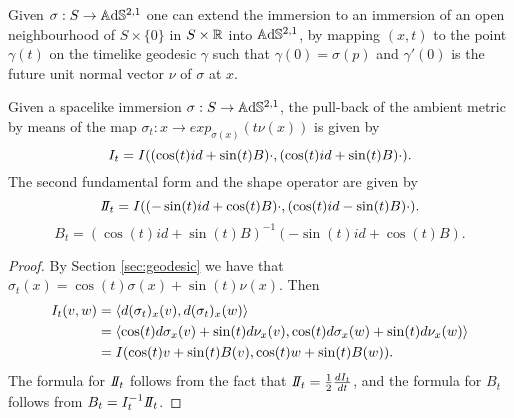 Given $\sigma:S \to \mathbb{A}\mathrm{d}\mathbb{S}^{2,1}$ one can extend the immersion to an immersion of an open neighbourhood of $S \times\{0\}$ in $S\times\mathbb{R}$ into $\mathbb{A}\mathrm{d}\mathbb{S}^{2,1}$, by mapping $(x,t)$ to the point $\gamma(t)$ on the timelike geodesic $\gamma$ such that $\gamma(0)=\sigma(p)$ and $\gamma'(0)$ is the future unit normal vector $\nu$ of $\sigma$ at $x$.

\begin{lemma}\label{lem:tub metric}
    Given a spacelike immersion $\sigma:S\to \mathbb{A}\mathrm{d}\mathbb{S}^{2,1}$, the pull-back of the ambient metric by means of the map $\sigma_t : x \to exp_{\sigma(x)}(t\nu(x))$ is given by 
    \[
        I_t = I((\cos(t) id + \sin(t) B)\cdot, (\cos(t) id + \sin(t) B)\cdot).
    \]
    The second fundamental form and the shape operator are given by
    \[
        \II_t = \I((-\sin(t) id + \cos(t) B)\cdot, (\cos(t) id - \sin(t) B)\cdot).
    \]
    \[
        B_t = (\cos(t) id + \sin(t) B)^{-1}(-\sin(t) id + \cos(t) B).
    \]
\end{lemma}

\begin{proof}
    By Section \ref{sec:geodesic} we have that $\sigma_t(x) = \cos(t)\sigma(x) + \sin(t) \nu(x)$.
    Then
    \[
    \begin{split}
        I_t (v,w)& = \langle d(\sigma_t)_x (v), d(\sigma_t)_x (w) \rangle \\
        & = \langle \cos(t)d\sigma_x (v) + \sin(t)d\nu_x (v), \cos(t)d\sigma_x (w) + \sin(t)d\nu_x (w) \rangle \\
        & = I(\cos(t) v + \sin(t) B(v), \cos(t) w + \sin(t) B(w) ).
    \end{split}
    \]
    The formula for $\II_t$ follows from the fact that $\II_t = \frac{1}{2} \frac{d \I_t}{d t}$, and the formula for $B_t$ follows from $B_t = I_t^{-1} \II_t$. 
\end{proof}


